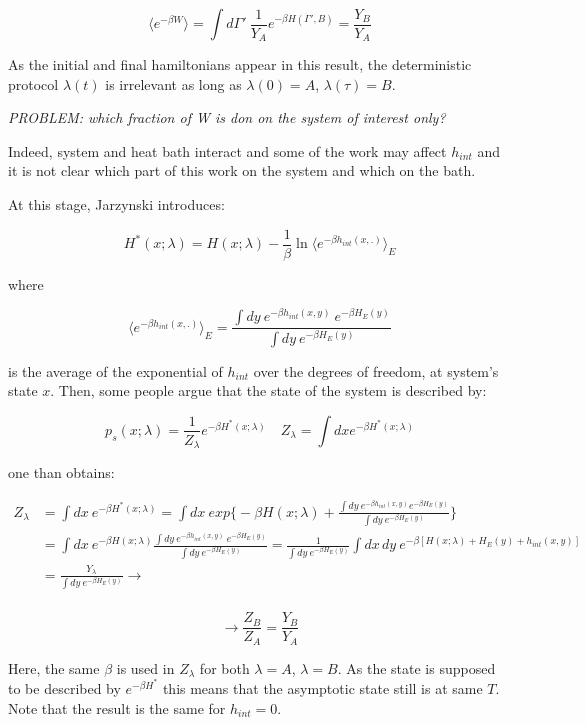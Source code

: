 \documentclass{article}
\begin{document}
$$\langle e^{-\beta W} \rangle = \int d \Gamma' \ \frac{1}{Y_A} e^{-\beta H(\Gamma',B)} = \frac{Y_B}{Y_A} $$

As the initial and final hamiltonians appear in this result, the deterministic protocol $\lambda(t)$ is irrelevant as long as $\lambda(0) = A$, $\lambda(\tau) = B$.

\emph{PROBLEM: which fraction of W is don on the system of interest only?}

Indeed, system and heat bath interact and some of the work may affect $h_{int}$ and it is not clear which part of this work on the system and which on the bath.

At this stage, Jarzynski introduces:

$$ H^*(x;\lambda) = H(x;\lambda) - \frac{1}{\beta} \ln \langle e^{-\beta h_{int}(x,.)}\rangle_E$$

where

$$ \langle e^{-\beta h_{int}(x,.)}\rangle_E = \frac{\int dy \ e^{-\beta h_{int}(x,y)} \ e^{- \beta H_E(y)} }{ \int dy \ e^{-\beta H_E(y)} }$$

is the average of the exponential of $h_{int}$ over the degrees of freedom, at system's state $x$. Then, some people argue that the state of the system is described by:

$$p_s(x;\lambda) = \frac{1}{Z_{\lambda}} e^{-\beta H^*(x;\lambda)} \quad Z_{\lambda} = \int dx e^{-\beta H^*(x;\lambda)}$$

one than obtains:

\begin{align*}
Z_{\lambda} & = \int dx \ e^{-\beta H^*(x;\lambda)} = \int dx \ exp \Big \{-\beta H(x;\lambda) + \frac{\int dy  \ e^{-\beta h_{int}(x,y)} e^{- \beta H_E(y)} }{ \int dy \ e^{-\beta H_E(y)} } \Big \} \\
& = \int dx \ e^{-\beta H(x;\lambda)}  \frac{\int dy \ e^{-\beta h_{int}(x,y)} \ e^{- \beta H_E(y)} }{ \int dy \ e^{-\beta H_E(y)} } = \frac{1}{ \int dy \ e^{-\beta H_E(y)}} \int dx \, dy \ e^{-\beta[H(x;\lambda)+H_E(y)+h_{int}(x,y)]} \\
& = \frac{Y_{\lambda}}{ \int dy \ e^{-\beta H_E(y)}} \longrightarrow \\
\end{align*}

\begin{equation}
\longrightarrow \frac{Z_B}{Z_A} = \frac{Y_B}{Y_A}
\end{equation}

Here, the same $\beta$ is used in $Z_{\lambda}$ for both $\lambda=A$, $\lambda=B$. As the state is supposed to be described by $e^{-\beta H^*}$ this means that the asymptotic state still is at same $T$. Note that the result is the same for $h_{int}=0$.
\end{document}
